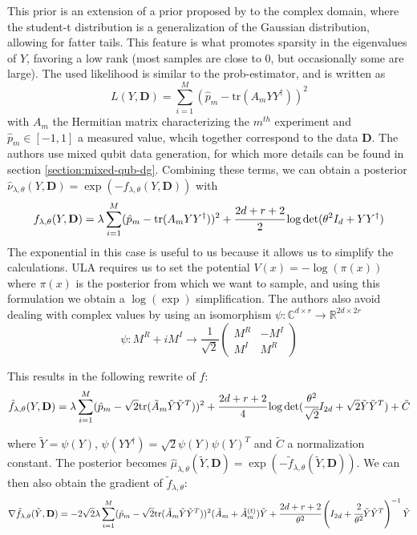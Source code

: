 \documentclass[12pt]{memoir}
\newcommand{\tr}{\text{tr}}
\newcommand{\mb}{\mathbf}
\begin{document}
This prior is an extension of a prior proposed by \cite{Dal20} to the complex domain, where the student-t distribution is a generalization of the Gaussian distribution, allowing for fatter tails. This feature is what promotes sparsity in the eigenvalues of $Y$, favoring a low rank (most samples are close to 0, but occasionally some are large).\medbreak
The used likelihood is similar to the prob-estimator, and is written as 
\begin{equation}
L(Y, \mb D) = \sum^{M}_{i=1} (\hat p_m - \tr(A_mYY^\dagger))^2
\end{equation}
with $A_m$ the Hermitian matrix characterizing the $m^{th}$ experiment and $\hat p_m \in [-1, 1]$ a measured value, whcih together correspond to the data $\mb D$. The authors use mixed qubit data generation, for which more details can be found in section \ref{section:mixed-qub-dg}. \medbreak
Combining these terms, we can obtain a posterior $\hat \nu_{\lambda, \theta}(Y, \mb D) = \exp(-f_{\lambda, \theta}(Y, \mb D))$ with
\begin{equation}
    f_{\lambda, \theta}(Y, \mb D) = \lambda \sum^{M}_{i=1} (\hat p_m - \tr(A_mYY^\dagger))^2 + \cfrac{2d + r + 2}{2}\log \det(\theta^2I_d + YY^\dagger)
\end{equation}
The exponential in this case is useful to us because it allows us to simplify the calculations. ULA requires us to set the potential $V(x) = -\log(\pi(x))$ where $\pi(x)$ is the posterior from which we want to sample, and using this formulation we obtain a $\log(\exp)$ simplification.\medbreak
The authors also avoid dealing with complex values by using an isomorphism $\psi: \mathbb{C}^{d\times r}\rightarrow \mathbb{R}^{2d\times 2r}$
\begin{equation}
\psi: M^R + iM^I \rightarrow \frac{1}{\sqrt 2} \begin{pmatrix}
    M^R & - M^I\\
    M^I & M^R
\end{pmatrix}
\end{equation}

This results in the following rewrite of $f$:
\begin{equation}    
\tilde f_{\lambda, \theta}(Y, \mb D) = \lambda \sum^{M}_{i=1} (\hat p_m - \sqrt{2}\tr(\tilde A_m \tilde Y \tilde Y^{T}))^2 + \cfrac{2d + r + 2}{4}\log \det(\cfrac{\theta^2}{\sqrt 2}I_{2d} + \sqrt 2 \tilde Y \tilde Y^{T}) + \tilde C
\end{equation}

where $\tilde Y = \psi(Y)$, $\psi(YY^\dagger) = \sqrt{2} \psi(Y)\psi(Y)^{T}$ and $\tilde C$ a normalization constant. The posterior becomes $\hat \mu_{\lambda, \theta}(\tilde Y, \mb D) =\exp(-\tilde f_{\lambda, \theta}(\tilde Y, \mb D))$. We can then also obtain the gradient of $\tilde f_{\lambda, \theta}$:
\begin{equation}
\nabla \tilde f_{\lambda, \theta}(\tilde Y, \mb D) = -2\sqrt 2 \lambda \sum^{M}_{i=1} (\hat p_m - \sqrt{2}\tr(\tilde A_m \tilde Y \tilde Y^{T}))^2 (\tilde A_m + \tilde A^{(t)}_m)\tilde Y + \cfrac{2d + r + 2}{\theta^2} \left(I_{2d} + \cfrac{2}{\theta^2}\tilde Y \tilde Y^{T}\right)^{-1} \tilde Y
\end{equation}
\end{document}
